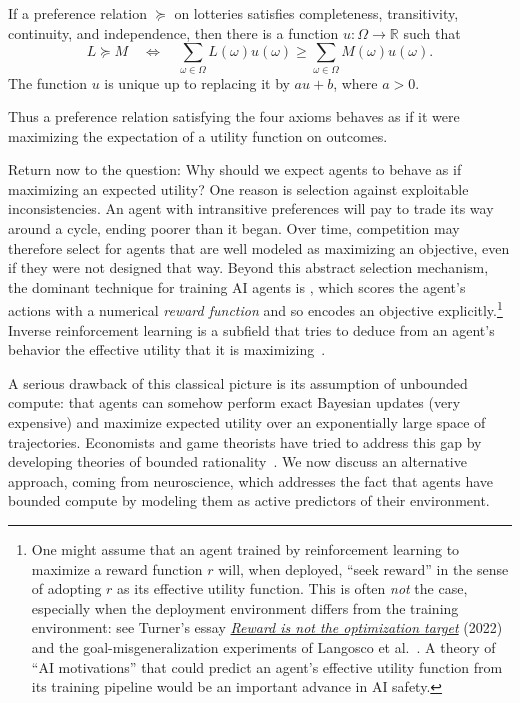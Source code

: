 \begin{theorem*}
If a preference relation $\succeq$ on lotteries satisfies completeness, transitivity, continuity, and independence, then there is a function $u:\Omega\to\mathbb R$ such that
\[
   L\succeq M
   \quad\Longleftrightarrow\quad
   \sum_{\omega\in\Omega}L(\omega)u(\omega)\geq \sum_{\omega\in\Omega}M(\omega)u(\omega).
\]
The function $u$ is unique up to replacing it by $au+b$, where $a>0$.
\end{theorem*}

Thus a preference relation satisfying the four axioms behaves as if it were maximizing the expectation of a utility function on outcomes. 

Return now to the question: Why should we expect agents to behave as if maximizing an expected utility? One reason is selection against exploitable inconsistencies. An agent with intransitive preferences will pay to trade its way around a cycle, ending poorer than it began. Over time, competition may therefore select for agents that are well modeled as maximizing an objective, even if they were not designed that way. Beyond this abstract selection mechanism, the dominant technique for training AI agents is , which scores the agent's actions with a numerical \emph{reward function} and so encodes an objective explicitly.\footnote{One might assume that an agent trained by reinforcement learning to maximize a reward function $r$ will, when deployed, ``seek reward'' in the sense of adopting $r$ as its effective utility function. This is often \emph{not} the case, especially when the deployment environment differs from the training environment: see Turner's essay \href{https://www.lesswrong.com/posts/pdaGN6pQyQarFHXF4/reward-is-not-the-optimization-target}{\emph{Reward is not the optimization target}} (2022) and the goal-misgeneralization experiments of Langosco et al.~\cite{langosco2022}. A theory of ``AI motivations'' that could predict an agent's effective utility function from its training pipeline would be an important advance in AI safety.}
Inverse reinforcement learning is a subfield that tries to deduce from an agent's behavior the effective utility that it is maximizing~\cite{ng2000,hadfieldmenell2016}.

A serious drawback of this classical picture is its assumption of unbounded compute: that agents can somehow perform exact Bayesian updates (very expensive) and maximize expected utility over an exponentially large space of trajectories. Economists and game theorists have tried to address this gap by developing theories of bounded rationality~\cite{rubinstein1998,mackowiak2023}. We now discuss an alternative approach, coming from neuroscience, which addresses the fact that agents have bounded compute by modeling them as active predictors of their environment.

